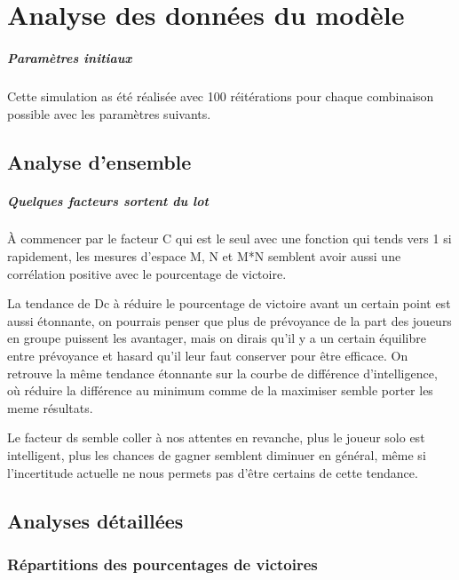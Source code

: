 \chapter{Analyse des données du modèle}

\paragraph{Paramètres initiaux}
Cette simulation as été réalisée avec 100 réitérations pour chaque combinaison possible avec les paramètres suivants.


\section{Analyse d'ensemble}


\paragraph{Quelques facteurs sortent du lot}
À commencer par le facteur C qui est le seul avec une fonction qui tends vers 1 si rapidement, les mesures d'espace M, N et M*N semblent avoir aussi une corrélation positive avec le pourcentage de victoire.

La tendance de Dc à réduire le pourcentage de victoire avant un certain point est aussi étonnante, on pourrais penser que plus de prévoyance de la part des joueurs en groupe puissent les avantager, mais on dirais qu'il y a un certain équilibre entre prévoyance et hasard qu'il leur faut conserver pour être efficace. 
On retrouve la même tendance étonnante sur la courbe de différence d'intelligence, où réduire la différence au minimum comme de la maximiser semble porter les meme résultats.


Le facteur ds semble coller à nos attentes en revanche, plus le joueur solo est intelligent, plus les chances de gagner semblent diminuer en général, même si l'incertitude actuelle ne nous permets pas d'être certains de cette tendance.



\section{Analyses détaillées}
\subsection{Répartitions des pourcentages de victoires}


